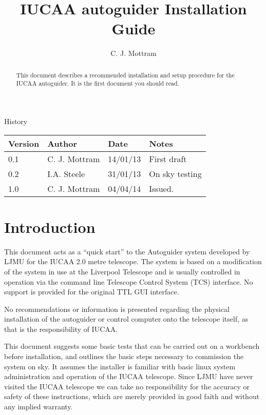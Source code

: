 \documentclass[10pt,a4paper]{article}
\title{IUCAA autoguider Installation Guide}
\author{C. J. Mottram}
\date{}
\begin{document}
\thispagestyle{empty}
\maketitle
\begin{abstract}
This document describes a recommended installation and setup procedure
for the IUCAA autoguider.  It is the first document you should read.

\end{abstract}
\centerline{\Large History}
\begin{center}
\begin{tabular}{|l|l|l|p{15em}|}
\hline
{\bf Version} & {\bf Author} & {\bf Date} & {\bf Notes} \\
\hline
0.1 & C. J. Mottram & 14/01/13 & First draft \\
0.2 & I.A. Steele   & 31/01/13 & On sky testing \\
1.0 & C. J. Mottram & 04/04/14 & Issued. \\
\hline
\end{tabular}
\end{center}

\newpage
\tableofcontents
\listoffigures
\listoftables
\newpage

\newcommand{\mytilde}{\raise.17ex\hbox{$\scriptstyle\mathtt{\sim}$}}

\section{Introduction}

This document acts as a ``quick start'' to the Autoguider system
developed by LJMU for the  IUCAA 2.0 metre telescope.  The system
is based on a modification of the system in use at the Liverpool
Telescope and is usually controlled in operation via the command line 
Telescope Control System (TCS) interface.  No support is provided for
the original TTL GUI interface.

No recommendations or information is presented regarding
the physical installation of the autoguider or control computer onto
the telescope itself, as that is the responsibility of IUCAA.

This document suggests some basic tests that can be carried out on
a workbench before installation, and outlines the basic steps
necessary to commission the system on sky.  It assumes the installer is
familiar with basic linux system administration and operation of the
IUCAA telescope.  Since LJMU have never visited the IUCAA telescope we
can take no responsibility for the accuracy or safety of these
instructions, which are merely provided in good faith and without any
implied warranty.
\end{document}
